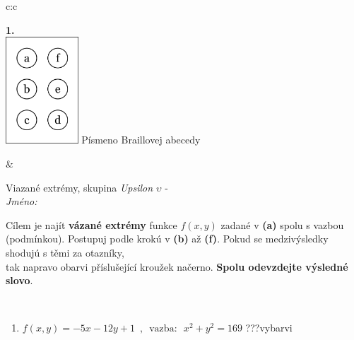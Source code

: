\documentclass[10pt]{report}
\begin{document}
\begin{tabular}{c:c}
\begin{minipage}[c][104.5mm][t]{0.5\linewidth}
\begin{center}
\begin{minipage}{0.79\linewidth}
\begin{center}
\begin{varwidth}{\linewidth}
\begin{enumerate}
\end{enumerate}
\end{varwidth}
\end{center}
\end{minipage}
\begin{minipage}{0.20\linewidth}
\begin{center}
{\Huge\bfseries 1.} \\[2mm]
\includegraphics[height=40mm]{../images/braille.png}
{\small Písmeno Braillovej abecedy}
\end{center}
\end{minipage}
\end{center}
\end{minipage}
&
\begin{minipage}[c][104.5mm][t]{0.5\linewidth}
\begin{center}
\vspace{7mm}
{\huge Viazané extrémy, skupina \textit{Upsilon $\upsilon$} -}\\[5mm]
\textit{Jméno:}\phantom{xxxxxxxxxxxxxxxxxxxxxxxxxxxxxxxxxxxxxxxxxxxxxxxxxxxxxxxxxxxxxxxxx}\\[5mm]
\begin{minipage}{0.95\linewidth}
\begin{center}
Cílem je najít \textbf{vázané extrémy} funkce $f(x,y)$ zadané v \textbf{(a)} spolu s vazbou (podmínkou). Postupuj podle krokú v \textbf{(b)} až \textbf{(f)}. Pokud se medzivýsledky shodujú s těmi za otazníky,\\tak napravo obarvi příslušející kroužek načerno. \textbf{Spolu odevzdejte výsledné slovo}.
\end{center}
\end{minipage}
\\[1mm]
\begin{minipage}{0.79\linewidth}
\begin{center}
\begin{varwidth}{\linewidth}
\begin{enumerate}
\normalsize
\item $f(x,y)=-5x-12y+1 \enspace , \enspace \mathrm{vazba:} \enspace x^2+y^2=169$\quad \dotfill\; ???\;\dotfill \quad vybarvi

\end{enumerate}
\end{varwidth}
\end{center}
\end{minipage}
\end{center}
\end{minipage}
\end{tabular}
\end{document}
